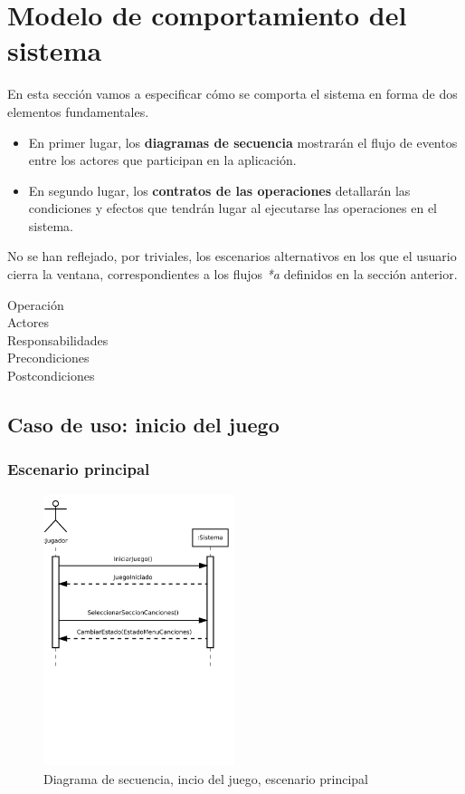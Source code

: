 
\section{Modelo de comportamiento del sistema}
En esta sección vamos a especificar cómo se comporta el sistema en forma de dos
elementos fundamentales.
\begin{itemize}
\item En primer lugar, los \textbf{diagramas de secuencia} mostrarán el flujo de
  eventos entre los actores que participan en la aplicación.
\item En segundo lugar, los \textbf{contratos de las operaciones} detallarán las
  condiciones y efectos que tendrán lugar al ejecutarse las operaciones en el
  sistema.
\end{itemize}

\begin{nota}
  No se han reflejado, por triviales, los escenarios alternativos en los que el
  usuario cierra la ventana, correspondientes a los flujos \textit{*a} definidos
  en la sección anterior.
\end{nota}

\begin{description}
\item[Operación] 
\item[Actores]
\item[Responsabilidades]
\item[Precondiciones]
\item[Postcondiciones]
\end{description}

\subsection{Caso de uso: inicio del juego}

\subsubsection{Escenario principal}

\begin{figure}[h!]
  \centering
  \includegraphics[trim=0cm 12cm 0cm 0cm, clip=true, width=0.5\textwidth]{4_analisis/diagsec_caso1_esc1}
  \caption{Diagrama de secuencia, incio del juego, escenario principal}
\end{figure}

